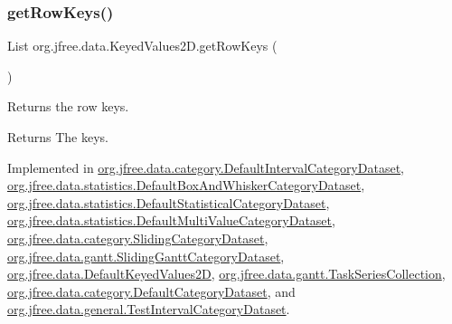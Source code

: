 \mbox{\label{interfaceorg_1_1jfree_1_1data_1_1_keyed_values2_d_aeda9aab284e61f69ca6e81370e76f70a}} 
\subsubsection{\texorpdfstring{get\+Row\+Keys()}{getRowKeys()}}
{\footnotesize\ttfamily List org.\+jfree.\+data.\+Keyed\+Values2\+D.\+get\+Row\+Keys (\begin{DoxyParamCaption}{ }\end{DoxyParamCaption})}

Returns the row keys.

\begin{DoxyReturn}{Returns}
The keys. 
\end{DoxyReturn}


Implemented in \mbox{\hyperlink{classorg_1_1jfree_1_1data_1_1category_1_1_default_interval_category_dataset_aa8a0a871f4557e0ef292fe5e9db0d55b}{org.\+jfree.\+data.\+category.\+Default\+Interval\+Category\+Dataset}}, \mbox{\hyperlink{classorg_1_1jfree_1_1data_1_1statistics_1_1_default_box_and_whisker_category_dataset_a9b93cea941b50fd0a0b908bfa0b1e278}{org.\+jfree.\+data.\+statistics.\+Default\+Box\+And\+Whisker\+Category\+Dataset}}, \mbox{\hyperlink{classorg_1_1jfree_1_1data_1_1statistics_1_1_default_statistical_category_dataset_abd2788a3ec62a9b685a1ef9dd75fa787}{org.\+jfree.\+data.\+statistics.\+Default\+Statistical\+Category\+Dataset}}, \mbox{\hyperlink{classorg_1_1jfree_1_1data_1_1statistics_1_1_default_multi_value_category_dataset_ae75c8347b1a96730dab876b0d0daede9}{org.\+jfree.\+data.\+statistics.\+Default\+Multi\+Value\+Category\+Dataset}}, \mbox{\hyperlink{classorg_1_1jfree_1_1data_1_1category_1_1_sliding_category_dataset_afac3ef11a6f20fcbae0b573ce8d9562e}{org.\+jfree.\+data.\+category.\+Sliding\+Category\+Dataset}}, \mbox{\hyperlink{classorg_1_1jfree_1_1data_1_1gantt_1_1_sliding_gantt_category_dataset_a196f0032878b86a97a1939a269590d83}{org.\+jfree.\+data.\+gantt.\+Sliding\+Gantt\+Category\+Dataset}}, \mbox{\hyperlink{classorg_1_1jfree_1_1data_1_1_default_keyed_values2_d_a5def878586be4fbe2c3bc7750eaac41b}{org.\+jfree.\+data.\+Default\+Keyed\+Values2D}}, \mbox{\hyperlink{classorg_1_1jfree_1_1data_1_1gantt_1_1_task_series_collection_a049adf2f25b6b3b2ea567fe902bf9b76}{org.\+jfree.\+data.\+gantt.\+Task\+Series\+Collection}}, \mbox{\hyperlink{classorg_1_1jfree_1_1data_1_1category_1_1_default_category_dataset_abc377b9d7b99192614e8a35984d7d5d3}{org.\+jfree.\+data.\+category.\+Default\+Category\+Dataset}}, and \mbox{\hyperlink{classorg_1_1jfree_1_1data_1_1general_1_1_test_interval_category_dataset_a33175ea9716119996c05f16cf32ccd3e}{org.\+jfree.\+data.\+general.\+Test\+Interval\+Category\+Dataset}}.

